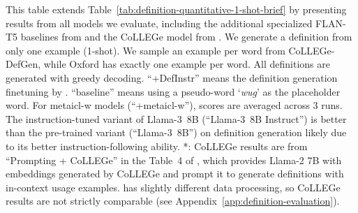 \documentclass{article}
\begin{document}
\begin{table*}[t]
{This table extends Table~\ref{tab:definition-quantitative-1-shot-brief} by presenting results from all models we evaluate, including the additional specialized \mbox{FLAN-T5} baselines from \citet{giulianelli-etal-2023-interpretable} and the CoLLEGe model from \citet{Teehan2024CoLLEGeCE}.
We generate a definition from only one example (1-shot). We sample an example per word from CoLLEGe-DefGen, while Oxford has exactly one example per word.
All definitions are generated with greedy decoding.
``+DefInstr'' means the definition generation finetuning by \citet{giulianelli-etal-2023-interpretable}.
``baseline'' means using a pseudo-word `\textit{wug}' as the placeholder word.
For \ac{metaicl-w} models (``+\ac{metaicl-w}''), scores are averaged across 3 runs.
The instruction-tuned variant of \mbox{Llama-3 8B} (``\mbox{Llama-3 8B} Instruct'') is better than the pre-trained variant (``\mbox{Llama-3 8B}'') on definition generation likely due to its better instruction-following ability.
*: CoLLEGe results are from ``Prompting + CoLLEGe'' in the Table~4 of \citet{Teehan2024CoLLEGeCE}, which provides \mbox{Llama-2} 7B \citep{Llama-2} with embeddings generated by CoLLEGe and prompt it to generate definitions with in-context usage examples. \citet{Teehan2024CoLLEGeCE} has slightly different data processing, so CoLLEGe results are not strictly comparable (see Appendix~\ref{app:definition-evaluation}).
}
\label{tab:definition-quantitative-1-shot}
\end{table*}
\end{document}
